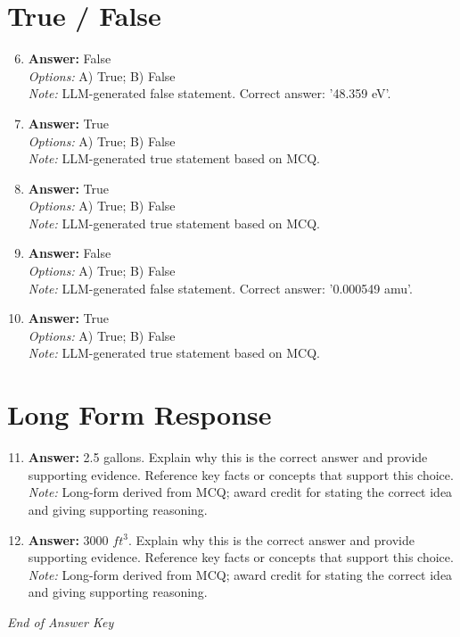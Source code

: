 \documentclass[12pt]{article}
\begin{document}
\section*{True / False}
\begin{enumerate}[label=\arabic*.]
\setcounter{enumi}{5}
\item \textbf{Answer:} False
\\ \textit{Options:} A) True; B) False
\\ \textit{Note:} LLM-generated false statement. Correct answer: '48.359 eV'.
\item \textbf{Answer:} True
\\ \textit{Options:} A) True; B) False
\\ \textit{Note:} LLM-generated true statement based on MCQ.
\item \textbf{Answer:} True
\\ \textit{Options:} A) True; B) False
\\ \textit{Note:} LLM-generated true statement based on MCQ.
\item \textbf{Answer:} False
\\ \textit{Options:} A) True; B) False
\\ \textit{Note:} LLM-generated false statement. Correct answer: '0.000549 amu'.
\item \textbf{Answer:} True
\\ \textit{Options:} A) True; B) False
\\ \textit{Note:} LLM-generated true statement based on MCQ.
\end{enumerate}

\section*{Long Form Response}
\begin{enumerate}[label=\arabic*.]
\setcounter{enumi}{10}
\item \textbf{Answer:} 2.5 gallons. Explain why this is the correct answer and provide supporting evidence. Reference key facts or concepts that support this choice.
\\ \textit{Note:} Long-form derived from MCQ; award credit for stating the correct idea and giving supporting reasoning.
\item \textbf{Answer:} 3000 $ft^3$. Explain why this is the correct answer and provide supporting evidence. Reference key facts or concepts that support this choice.
\\ \textit{Note:} Long-form derived from MCQ; award credit for stating the correct idea and giving supporting reasoning.
\end{enumerate}

\vfill
\noindent\textit{End of Answer Key}
\end{document}
